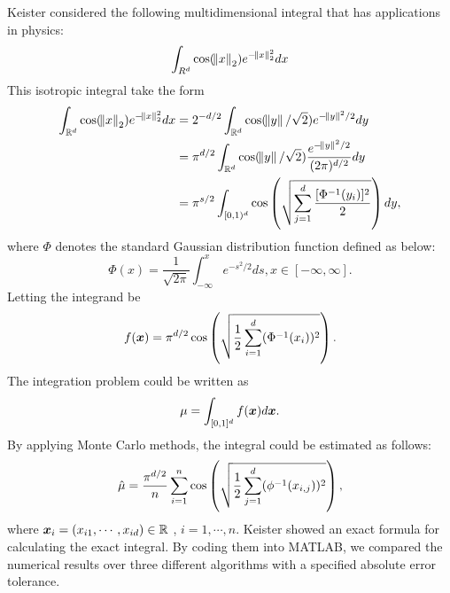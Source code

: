 \documentclass{iitthesis}
\theoremstyle{definition}
\begin{document}
\label{subsec:keitertestfunmeanMCg}
Keister \cite{Keister96} considered the following multidimensional integral that has applications in physics:
\begin{equation}\label{KeisterTestFun}
\int_{R^d} \cos (\norm{x}_2)e^{-\norm{x}_2^2} dx 
\end{equation}
This isotropic integral take the form
\begin{align}
 \int_{\mathbb{R}^d} \cos (\norm{x}_2)e^{-\norm{x}_2^2} dx &= 2^{-d/2}\int_{\mathbb{R}^d} \cos(\norm{y}/\sqrt{2}) e^{-\norm{y}^2/2} dy \\
&= \pi^{d/2} \int_{\mathbb{R}^d} \cos(\norm{y}/\sqrt{2}) \frac{e^{-\norm{y}^2/2}}{(2\pi)^{d/2}} dy\\
 &= \pi^{s/2} \int_{[0,1)^d} \cos \left ( \sqrt{\sum_{j=1}^d \frac{[\Phi^{-1}(y_i)]^2}{2}}\right )dy,
\end{align}
where $\Phi$ denotes the standard Gaussian distribution function defined as below:
$$\Phi(x) = \frac{1}{\sqrt{2\pi}} \int_{-\infty}^x e^{-s^2/2}ds, x \in [-\infty, \infty].$$
Letting the integrand be 
\begin{equation}
f(\boldsymbol{x}) = \pi^{d/2} \cos \left( \sqrt{\frac{1}{2} \sum_{i=1}^d (\Phi^{-1} (x_i))^2}\right).
\end{equation}
The integration problem could be written as
\begin{equation}
\mu = \int_{[0,1]^d} f(\boldsymbol{x})d\boldsymbol{x}.
\end{equation}
By applying Monte Carlo methods, the integral could be estimated as follows:
\begin{align}
\hat{\mu} = \frac{\pi^{d/2}}{n}\sum_{i=1}^n \cos \left (\sqrt{\frac12 \sum_{j=1}^d (\phi^{-1}(x_{i,j}))^2}\right),
\end{align}
where $\boldsymbol{x}_i = (x_{i1},\cdots,x_{id}) \in \mathbb{R}$ , $i=1,\cdots, n.$
Keister \cite{Keister96} showed an exact formula for calculating the exact integral. By coding them into MATLAB, we compared the numerical results over three different algorithms with a specified absolute error tolerance.
\end{document}
